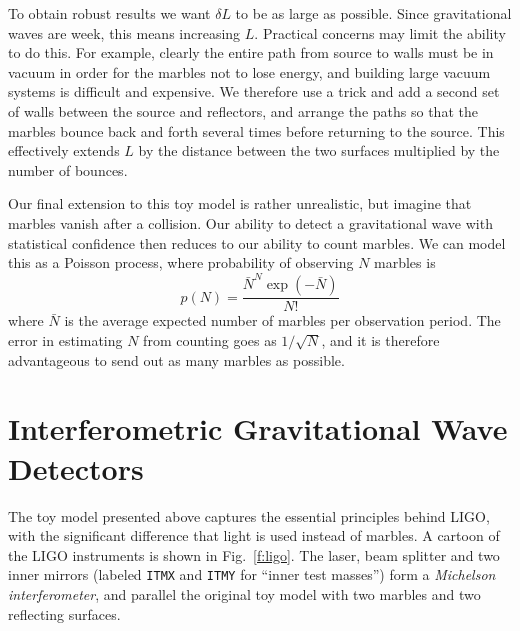 To obtain robust results we want $\delta L$ to be as large as
possible.  Since gravitational waves are week, this means increasing
$L$.  Practical concerns may limit the ability to do this.  For
example, clearly the entire path from source to walls must be in
vacuum in order for the marbles not to lose energy, and building large
vacuum systems is difficult and expensive.  We therefore use a trick
and add a second set of walls between the source and reflectors, and
arrange the paths so that the marbles bounce back and forth several
times before returning to the source.  This effectively extends $L$ by
the distance between the two surfaces multiplied by the number of
bounces.

Our final extension to this toy model is rather unrealistic, but
imagine that marbles vanish after a collision.  Our ability to detect a
gravitational wave with statistical confidence then reduces to our
ability to count marbles.  We can model this as a Poisson process, where
probability of observing $N$ marbles is 
%
\begin{equation*}
p(N) = \frac{\bar{N}^N \exp(-\bar{N})} {N!}
\end{equation*}
%
where $\bar{N}$ is the average expected number of marbles per
observation period.  The error in estimating $N$ from counting goes as
$1/\sqrt{N}$, and it is therefore advantageous to send out as many 
marbles as possible.

\section{Interferometric Gravitational Wave Detectors}

The toy model presented above captures the essential principles behind
LIGO, with the significant difference that light is used instead of
marbles.  A cartoon of the LIGO instruments is shown in
Fig.~\ref{f:ligo}.  The laser, beam splitter and two inner mirrors
(labeled \texttt{ITMX} and \texttt{ITMY} for ``inner test masses'')
form a \emph{Michelson interferometer}, and parallel the original toy
model with two marbles and two reflecting surfaces.

